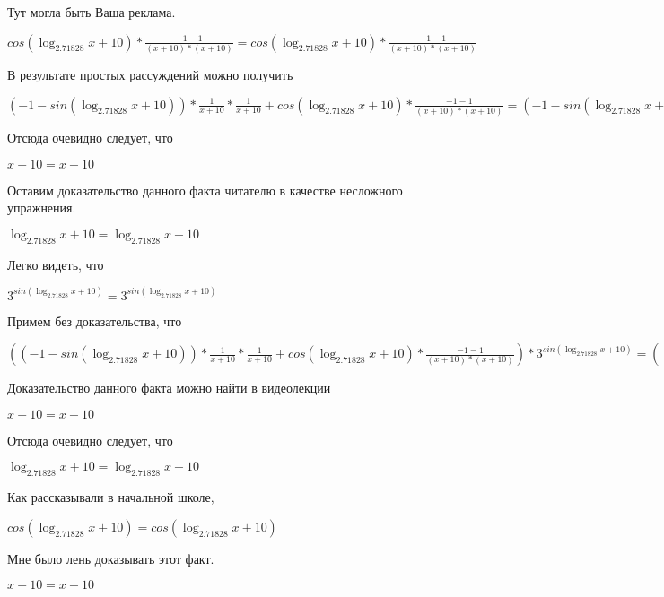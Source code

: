 \documentclass[12pt,a4paper,fleqn]{article}
\theoremstyle{definition}
\begin{document}
Тут могла быть Ваша реклама. 

$cos(\log_{ 2.71828 }{ x  +  10 }) * \frac{ -1  -  1 }{( x  +  10 ) * ( x  +  10 )}
 = cos(\log_{ 2.71828 }{ x  +  10 }) * \frac{ -1  -  1 }{( x  +  10 ) * ( x  +  10 )}
$

В результате простых рассуждений можно получить 

$( -1  - sin(\log_{ 2.71828 }{ x  +  10 })) * \frac{ 1 }{ x  +  10 }
 * \frac{ 1 }{ x  +  10 }
 + cos(\log_{ 2.71828 }{ x  +  10 }) * \frac{ -1  -  1 }{( x  +  10 ) * ( x  +  10 )}
 = ( -1  - sin(\log_{ 2.71828 }{ x  +  10 })) * \frac{ 1 }{ x  +  10 }
 * \frac{ 1 }{ x  +  10 }
 + cos(\log_{ 2.71828 }{ x  +  10 }) * \frac{ -1  -  1 }{( x  +  10 ) * ( x  +  10 )}
$

Отсюда очевидно следует, что 

$ x  +  10  =  x  +  10 $

Оставим доказательство данного факта читателю в качестве несложного упражнения. 

$\log_{ 2.71828 }{ x  +  10 } = \log_{ 2.71828 }{ x  +  10 }$

Легко видеть, что 

${ 3 }^{sin(\log_{ 2.71828 }{ x  +  10 })} = { 3 }^{sin(\log_{ 2.71828 }{ x  +  10 })}$

Примем без доказательства, что 

$(( -1  - sin(\log_{ 2.71828 }{ x  +  10 })) * \frac{ 1 }{ x  +  10 }
 * \frac{ 1 }{ x  +  10 }
 + cos(\log_{ 2.71828 }{ x  +  10 }) * \frac{ -1  -  1 }{( x  +  10 ) * ( x  +  10 )}
) * { 3 }^{sin(\log_{ 2.71828 }{ x  +  10 })} = (( -1  - sin(\log_{ 2.71828 }{ x  +  10 })) * \frac{ 1 }{ x  +  10 }
 * \frac{ 1 }{ x  +  10 }
 + cos(\log_{ 2.71828 }{ x  +  10 }) * \frac{ -1  -  1 }{( x  +  10 ) * ( x  +  10 )}
) * { 3 }^{sin(\log_{ 2.71828 }{ x  +  10 })}$

Доказательство данного факта можно найти в \href{https://www.youtube.com/watch?v=dQw4w9WgXcQ}{видеолекции} 

$ x  +  10  =  x  +  10 $

Отсюда очевидно следует, что 

$\log_{ 2.71828 }{ x  +  10 } = \log_{ 2.71828 }{ x  +  10 }$

Как рассказывали в начальной школе, 

$cos(\log_{ 2.71828 }{ x  +  10 }) = cos(\log_{ 2.71828 }{ x  +  10 })$

Мне было лень доказывать этот факт.

$ x  +  10  =  x  +  10 $
\end{document}
